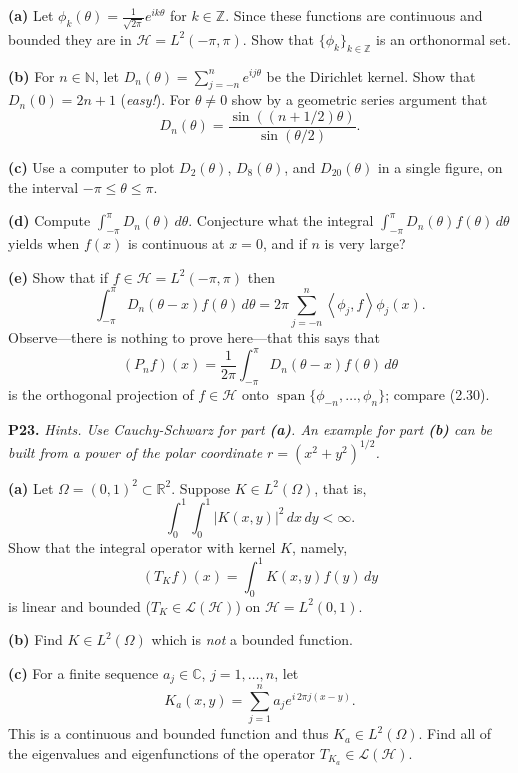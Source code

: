 \documentclass[12pt]{amsart}
\newcommand{\cH}{\mathcal{H}}
\newcommand{\cL}{\mathcal{L}}
\newcommand{\CC}{\mathbb{C}}
\newcommand{\NN}{\mathbb{N}}
\newcommand{\RR}{\mathbb{R}}
\newcommand{\ZZ}{\mathbb{Z}}
\newcommand{\ip}[2]{\ensuremath{\left<#1,#2\right>}}
\newcommand{\Span}{\operatorname{span}}
\newcommand{\prob}[1]{\bigskip\noindent\textbf{#1.}\quad }
\newcommand{\epart}[1]{\medskip\noindent\textbf{(#1)}\quad }
\newcommand{\ds}{\displaystyle}
\begin{document}
\epart{a}  Let $\ds \phi_k(\theta) = \frac{1}{\sqrt{2 \pi}} e^{ik\theta}$ for $k\in\ZZ$.  Since these functions are continuous and bounded they are in $\cH=L^2(-\pi,\pi)$.  Show that $\{\phi_k\}_{k\in\ZZ}$ is an orthonormal set.

\epart{b}  For $n\in\NN$, let $\ds D_n(\theta) = \sum_{j=-n}^n e^{ij\theta}$ be the Dirichlet kernel.  Show that $D_n(0)=2n+1$ (\emph{easy!}).  For $\theta\ne 0$ show by a geometric series argument that
	$$D_n(\theta) = \frac{\sin\left((n+1/2)\theta\right)}{\sin(\theta/2)}.$$

\epart{c}  Use a computer to plot $D_2(\theta)$, $D_8(\theta)$, and $D_{20}(\theta)$ in a single figure, on the interval $-\pi \le \theta \le \pi$.

\epart{d}  Compute $\ds \int_{-\pi}^\pi D_n(\theta)\,d\theta$.  Conjecture what the integral $\ds \int_{-\pi}^\pi D_n(\theta) f(\theta)\,d\theta$ yields when $f(x)$ is continuous at $x=0$, and if $n$ is very large?

\epart{e}  Show that if $f\in\cH=L^2(-\pi,\pi)$ then
	$$\int_{-\pi}^\pi D_n(\theta - x) f(\theta)\,d\theta = 2\pi \sum_{j=-n}^n \ip{\phi_j}{f} \phi_j(x).$$
Observe---there is nothing to prove here---that this says that
	$$(P_n f)(x) = \frac{1}{2\pi} \int_{-\pi}^\pi D_n(\theta - x) f(\theta)\,d\theta$$
is the orthogonal projection of $f \in \cH$ onto $\Span\{\phi_{-n},\dots,\phi_n\}$; compare (2.30).


\prob{P23}  \emph{Hints.  Use Cauchy-Schwarz for part \emph{\textbf{(a)}}.  An example for part \emph{\textbf{(b)}} can be built from a power of the polar coordinate $r=(x^2+y^2)^{1/2}$.}

\epart{a}  Let $\Omega=(0,1)^2 \subset \RR^2$.  Suppose $K \in L^2(\Omega)$, that is,
	$$\int_0^1 \int_0^1 |K(x,y)|^2\,dx\,dy < \infty.$$
Show that the integral operator with kernel $K$, namely,
	$$(T_K f)(x) = \int_0^1 K(x,y) f(y)\,dy$$
is linear and bounded ($T_K \in\cL(\cH)$) on $\cH = L^2(0,1)$.

\epart{b} Find $K \in L^2(\Omega)$ which is \emph{not} a bounded function.

\epart{c} For a finite sequence $a_j\in\CC$, $j=1,\dots,n$, let
    $$K_{a}(x,y) = \sum_{j=1}^n a_j e^{i \,2\pi j(x-y)}.$$
This is a continuous and bounded function and thus $K_a \in L^2(\Omega)$.  Find all of the eigenvalues and eigenfunctions of the operator $T_{K_a} \in \cL(\cH)$.
\end{document}
